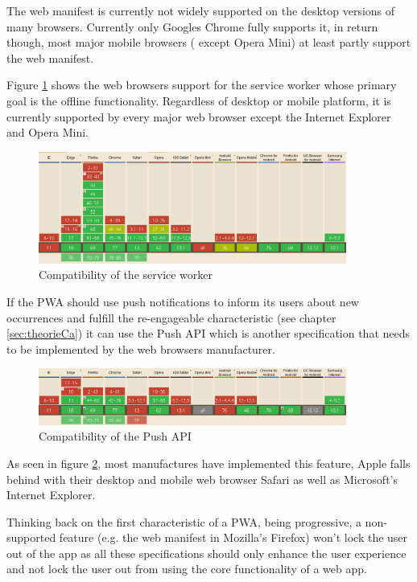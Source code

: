 The web manifest is currently not widely supported on the desktop versions of many browsers. Currently only Googles Chrome fully supports it, in return though, most major mobile browsers ( except Opera Mini) at least partly support the web manifest. 

Figure \ref{fig:pwacompatibilityserviceworker} shows the web browsers support for the service worker whose primary goal is the offline functionality. Regardless of desktop or mobile platform, it is currently supported by every major web browser except the Internet Explorer and Opera Mini.

\begin{figure}[htbp] 
	\centering
	\includegraphics[width=0.9\textwidth]{Assets/chapter_pwa/serviceworkersupport.PNG}
	\caption{Compatibility of the service worker}
	\label{fig:pwacompatibilityserviceworker}
\end{figure}

If the  \acs{PWA} should use push notifications to inform its users about new occurrences and fulfill the re-engageable characteristic (see chapter \ref{sec:theorieCa}) it can use the Push API which is another specification that needs to be implemented by the web browsers manufacturer.

\begin{figure}[htbp] 
	\centering
	\includegraphics[width=0.9\textwidth]{Assets/chapter_pwa/pushapisupport.PNG}
	\caption{Compatibility of the Push API}
	\label{fig:pwacompatibilitypushapi}
\end{figure}

As seen in figure \ref{fig:pwacompatibilitypushapi}, most manufactures have implemented this feature, Apple falls behind with their desktop and mobile web browser Safari as well as Microsoft’s Internet Explorer.

Thinking back on the first characteristic of a  \acs{PWA}, being progressive, a non-supported feature (e.g. the web manifest in Mozilla's Firefox) won’t lock the user out of the app as all these specifications should only enhance the user experience and not lock the user out from using the core functionality of a web app.